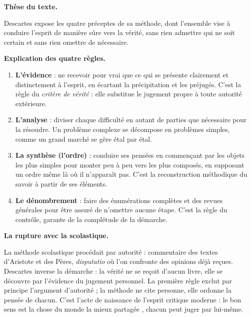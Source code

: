 \documentclass[11pt]{article}
\begin{document}
\begin{corrige}

\textbf{Thèse du texte.}\par Descartes expose les quatre préceptes de sa méthode, dont l'ensemble vise à conduire l'esprit de manière sûre vers la vérité, sans rien admettre qui ne soit certain et sans rien omettre de nécessaire.

\textbf{Explication des quatre règles.}\par
\begin{enumerate}
\item \textbf{L'évidence} : ne recevoir pour vrai que ce qui se présente clairement et distinctement à l'esprit, en écartant la précipitation et les préjugés. C'est la règle du \emph{critère de vérité} : elle substitue le jugement propre à toute autorité extérieure.
\item \textbf{L'analyse} : diviser chaque difficulté en autant de parties que nécessaire pour la résoudre. Un problème complexe se décompose en problèmes simples, comme un grand marché se gère étal par étal.
\item \textbf{La synthèse (l'ordre)} : conduire ses pensées en commençant par les objets les plus simples pour monter peu à peu vers les plus composés, en supposant un ordre même là où il n'apparaît pas. C'est la reconstruction méthodique du savoir à partir de ses éléments.
\item \textbf{Le dénombrement} : faire des énumérations complètes et des revues générales pour être assuré de n'omettre aucune étape. C'est la règle du contrôle, garante de la complétude de la démarche.
\end{enumerate}

\textbf{La rupture avec la scolastique.}\par La méthode scolastique procédait par autorité : commentaire des textes d'Aristote et des Pères, \emph{disputatio} où l'on confronte des opinions déjà reçues. Descartes inverse la démarche : la vérité ne se reçoit d'aucun livre, elle se découvre par l'évidence du jugement personnel. La première règle exclut par principe l'argument d'autorité ; la méthode ne cite personne, elle ordonne la pensée de chacun. C'est l'acte de naissance de l'esprit critique moderne : \guillemotleft le bon sens est la chose du monde la mieux partagée \guillemotright, chacun peut juger par lui-même.


\end{corrige}
\end{document}
